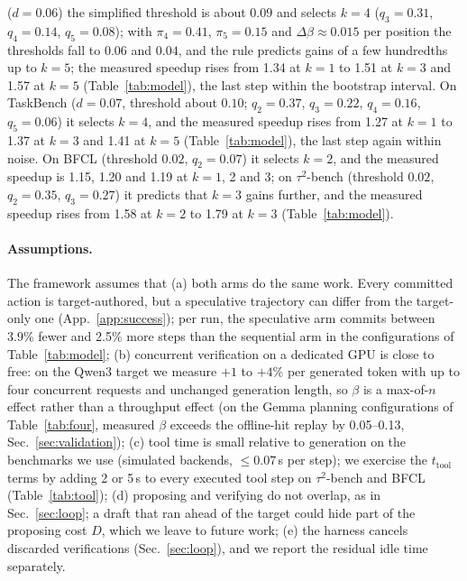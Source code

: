 ($d = 0.06$) the simplified threshold is about $0.09$ and selects $k = 4$
($q_3 = 0.31$, $q_4 = 0.14$, $q_5 = 0.08$); with $\pi_4 = 0.41$, $\pi_5 = 0.15$
and $\Delta\beta \approx 0.015$ per position the thresholds fall to $0.06$ and
$0.04$, and the rule predicts gains of a few hundredths up to $k = 5$; the measured speedup rises from
1.34\xx{} at $k{=}1$ to 1.51\xx{} at $k{=}3$ and 1.57\xx{} at $k{=}5$ (Table~\ref{tab:model}), the last
step within the bootstrap interval. On TaskBench ($d = 0.07$, threshold about $0.10$; $q_2 = 0.37$,
$q_3 = 0.22$, $q_4 = 0.16$, $q_5 = 0.06$) it selects $k = 4$, and the measured speedup rises
from 1.27\xx{} at $k{=}1$ to 1.37\xx{} at $k{=}3$ and 1.41\xx{} at $k{=}5$
(Table~\ref{tab:model}), the last step again within noise. On BFCL (threshold $0.02$, $q_2 = 0.07$)
it selects $k = 2$, and the measured speedup is 1.15, 1.20 and 1.19\xx{} at $k = 1$, 2 and 3; on $\tau^2$-bench (threshold $0.02$, $q_2 = 0.35$, $q_3 = 0.27$) it predicts that $k = 3$ gains further,
and the measured speedup rises from 1.58\xx{} at $k{=}2$ to 1.79\xx{} at $k{=}3$
(Table~\ref{tab:model}).

\paragraph{Assumptions.}
The framework assumes that (a) both arms do the same work. Every committed action is
target-authored, but a speculative trajectory can differ from the target-only one
(App.~\ref{app:success}); per run, the speculative arm commits between 3.9\% fewer and
2.5\% more steps than the sequential arm in the configurations of Table~\ref{tab:model};
(b) concurrent verification on a dedicated GPU is close to free: on the Qwen3 target we measure
$+1$ to $+4\%$ per generated token with up to four concurrent requests and
unchanged generation length, so $\beta$ is a max-of-$n$ effect rather than a
throughput effect (on the Gemma planning configurations of Table~\ref{tab:four}, measured $\beta$
exceeds the offline-hit replay by 0.05--0.13, Sec.~\ref{sec:validation}); (c) tool time is small relative to generation on the
benchmarks we use (simulated backends, $\le 0.07$\,s per step); we exercise the
$t_{\mathrm{tool}}$ terms by adding 2 or 5\,s to every executed tool step on $\tau^2$-bench and BFCL
(Table~\ref{tab:tool}); (d) proposing and
verifying do not overlap, as in Sec.~\ref{sec:loop}; a draft that ran ahead of
the target could hide part of the proposing cost $D$, which we leave to future work; (e) the
harness cancels discarded verifications (Sec.~\ref{sec:loop}), and we report the
residual idle time separately.
